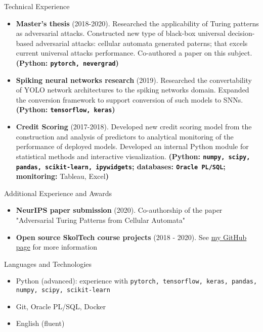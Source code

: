 \documentclass[]{mcdowellcv}
\begin{document}
	\begin{cvsection}{Technical Experience}
		\begin{cvsubsection}{}{}{}
			\begin{itemize}
			    \item \textbf{Master's thesis} (2018-2020). Researched the applicability of Turing patterns as adversarial attacks. Constructed new type of black-box universal decision-based adversarial attacks: cellular automata generated paterns; that excels current universal attacks performance. Co-authored a paper on this subject. \textbf{(Python: \texttt{pytorch, nevergrad})}
			    \item \textbf{Spiking neural networks research} (2019). Researched the convertability of YOLO network architectures to the spiking networks domain. Expanded the conversion framework to support conversion of such models to SNNs. \textbf{(Python: \texttt{tensorflow, keras})}
			    \item \textbf{Credit Scoring} (2017-2018). Developed new credit scoring model from the construction and analysis of predictors to analytical monitoring of the performance of deployed models. Developed an internal Python module for statistical methods and interactive visualization. \textbf{(Python: \texttt{numpy, scipy, pandas, scikit-learn, ipywidgets}; databases: \texttt{Oracle PL/SQL}; monitoring:} Tableau, Excel\textbf{)}
			\end{itemize}
		\end{cvsubsection}
	\end{cvsection}
	
	\begin{cvsection}{Additional Experience and Awards}
		\begin{cvsubsection}{}{}{}	
			\begin{itemize}
			    \item \textbf{NeurIPS paper submission} (2020). Co-authorship of the paper "Adversarial Turing Patterns from Cellular Automata"
			    \item \textbf{Open source SkolTech course projects} (2018 - 2020). See \href{https://github.com/lapsya}{my GitHub page} for more information
			\end{itemize}
		\end{cvsubsection}
	\end{cvsection}
	
	\begin{cvsection}{Languages and Technologies}
		\begin{cvsubsection}{}{}{}	
			\begin{itemize}
				\item Python (advanced): experience with \texttt{pytorch, tensorflow, keras, pandas, numpy, scipy, scikit-learn}
				\item Git, Oracle PL/SQL, Docker
				
				\item English (fluent)
			\end{itemize}
		\end{cvsubsection}
	\end{cvsection}
	
\end{document}
